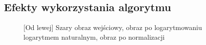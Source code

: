 \documentclass[a4paper,12pt, titlepage]{report}
\begin{document}
\subsection*{Efekty wykorzystania algorytmu}
\begin{figure}[h]
    \centering
    \caption{[Od lewej] Szary obraz wejściowy, obraz po logarytmowaniu logarytmem naturalnym, obraz po normalizacji}%
    \label{fig:geo_after_grey1}%
\end{figure}
\FloatBarrier
\end{document}
